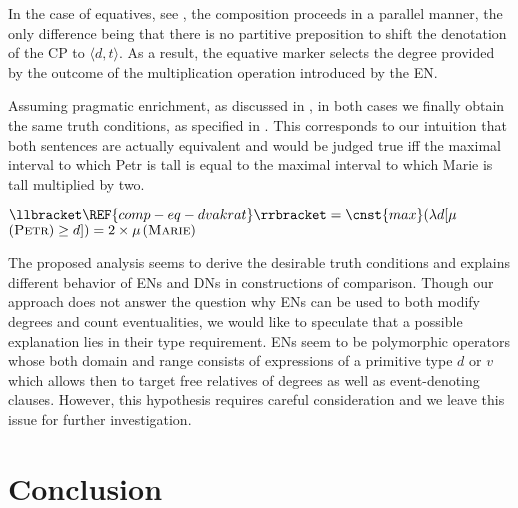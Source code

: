 \documentclass[output=paper,
modfonts,
hidelinks,
newtxmath
]{langscibook}
\begin{document}
In the case of equatives, see , the composition proceeds in a parallel manner, the only difference being that there is no partitive preposition to shift the denotation of the CP to $\langle d,t\rangle$. As a result, the equative marker selects the degree provided by the outcome of the multiplication operation introduced by the EN.

Assuming pragmatic enrichment, as discussed in , in both cases we finally obtain the same truth conditions, as specified in . This corresponds to our intuition that both sentences are actually equivalent and would be judged true iff the maximal interval to which Petr is tall is equal to the maximal interval to which Marie is tall multiplied by two.


\ea $\llbracket \REF{comp-eq-dvakrat}\rrbracket = \cnst{max}(\lambda d[\mu$$(\textsc{Petr})\geq d]) = 2 \times \mu$$(\textsc{Marie})$\label{eq-dvakrat-int}
\z

\noindent The proposed analysis seems to derive the desirable truth conditions and explains different behavior of ENs and DNs in constructions of comparison. Though our approach does not answer the question why ENs can be used to both modify degrees and count eventualities, we would like to speculate that a possible explanation lies in their type requirement. ENs seem to be polymorphic operators whose both domain and range consists of expressions of a primitive type $d$ or $v$ which allows then to target free relatives of degrees as well as event-denoting clauses. However, this hypothesis requires careful consideration and we leave this issue for further investigation. 

\section{Conclusion}\label{conclusion}
\end{document}
